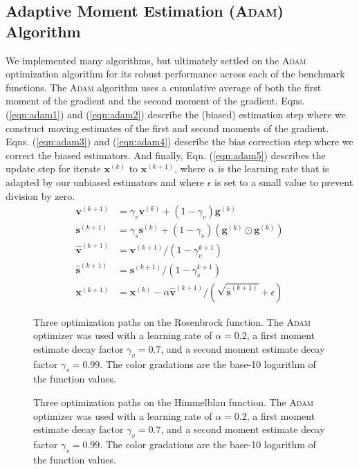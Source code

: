 \documentclass[conference]{IEEEtran}
\begin{document}
\subsection{Adaptive Moment Estimation (\textsc{Adam}) Algorithm}

We implemented many algorithms, but ultimately settled on the \textsc{Adam} optimization algorithm for its robust performance across each of the benchmark functions. The \textsc{Adam} algorithm uses a cumulative average of both the first moment of the gradient and the second moment of the gradient. Eqns. (\ref{eqn:adam1}) and (\ref{eqn:adam2}) describe the (biased) estimation step where we construct moving estimates of the first and second moments of the gradient. Eqns. (\ref{eqn:adam3}) and (\ref{eqn:adam4}) describe the bias correction step where we correct the biased estimators. And finally, Eqn. (\ref{eqn:adam5}) describes the update step for iterate $\textbf{x}^{(k)}$ to $\textbf{x}^{(k+1)}$, where $\alpha$ is the learning rate that is adapted by our unbiased estimators and where $\epsilon$ is set to a small value to prevent division by zero.
\begin{align}
    \textbf{v}^{(k+1)} &= \gamma_v \textbf{v}^{(k)} + (1 - \gamma_v) \textbf{g}^{(k)} \label{eqn:adam1} \\
    \textbf{s}^{(k+1)} &= \gamma_s \textbf{s}^{(k)} + (1 - \gamma_s) (\textbf{g}^{(k)} \odot \textbf{g}^{(k)}) \label{eqn:adam2} \\
    \hat{\textbf{v}}^{(k+1)} &= \textbf{v}^{(k+1)}/(1 - \gamma_v^{k+1}) \label{eqn:adam3} \\
    \hat{\textbf{s}}^{(k+1)} &= \textbf{s}^{(k+1)}/(1 - \gamma_s^{k+1}) \label{eqn:adam4} \\
    \textbf{x}^{(k+1)} &= \textbf{x}^{(k)} - \alpha \hat{\textbf{v}}^{(k+1)}/ \left(\sqrt{\hat{\textbf{s}}^{(k+1)}} + \epsilon\right) \label{eqn:adam5} 
\end{align}

\begin{figure}[h]
    \centering
    
    \caption{Three optimization paths on the Rosenbrock function. The \textsc{Adam} optimizer was used with a learning rate of $\alpha = 0.2$, a first moment estimate decay factor $\gamma_v = 0.7$, and a second moment estimate decay factor $\gamma_s = 0.99$. The color gradations are the base-10 logarithm of the function values.}
    \label{fig:rosenbrock_opt}
\end{figure}
\begin{figure}[h]
    \centering
    
    \caption{Three optimization paths on the Himmelblau function. The \textsc{Adam} optimizer was used with a learning rate of $\alpha = 0.2$, a first moment estimate decay factor $\gamma_v = 0.7$, and a second moment estimate decay factor $\gamma_s = 0.99$. The color gradations are the base-10 logarithm of the function values.}
    \label{fig:himmelblau_opt}
\end{figure}
\end{document}

